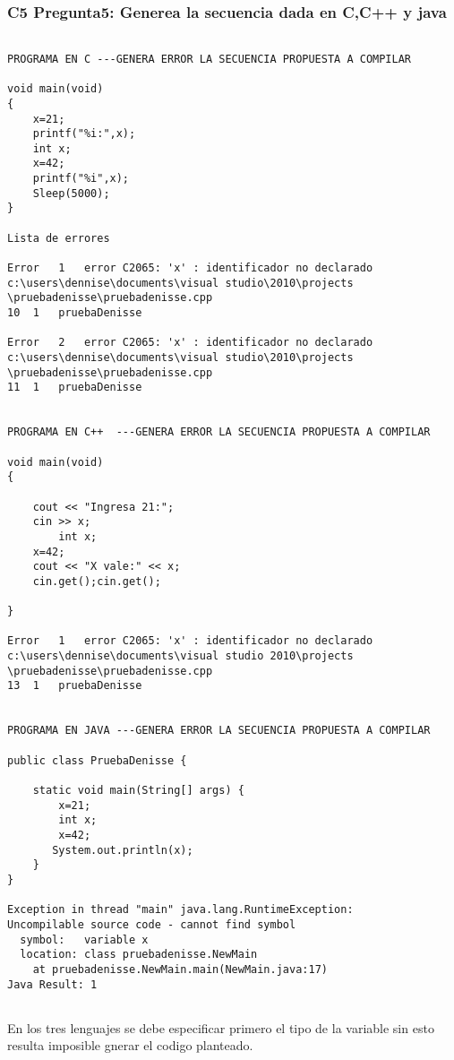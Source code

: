 \subsubsection{C5 Pregunta5: Generea la secuencia dada en C,C++ y java}

\begin{verbatim}

PROGRAMA EN C ---GENERA ERROR LA SECUENCIA PROPUESTA A COMPILAR

void main(void)
{
	x=21;
	printf("%i:",x);
	int x;
	x=42;
	printf("%i",x);
	Sleep(5000);
}

Lista de errores

Error	1	error C2065: 'x' : identificador no declarado
c:\users\dennise\documents\visual studio\2010\projects
\pruebadenisse\pruebadenisse.cpp	
10	1	pruebaDenisse

Error	2	error C2065: 'x' : identificador no declarado	
c:\users\dennise\documents\visual studio\2010\projects
\pruebadenisse\pruebadenisse.cpp
11	1	pruebaDenisse


PROGRAMA EN C++  ---GENERA ERROR LA SECUENCIA PROPUESTA A COMPILAR

void main(void)
{
	
	cout << "Ingresa 21:";
	cin >> x;
        int x;
	x=42;
	cout << "X vale:" << x;
	cin.get();cin.get();
	
}

Error	1	error C2065: 'x' : identificador no declarado 
c:\users\dennise\documents\visual studio 2010\projects
\pruebadenisse\pruebadenisse.cpp
13	1	pruebaDenisse


PROGRAMA EN JAVA ---GENERA ERROR LA SECUENCIA PROPUESTA A COMPILAR

public class PruebaDenisse {

    static void main(String[] args) {
        x=21;
        int x;
        x=42;
       System.out.println(x);
    }
}

Exception in thread "main" java.lang.RuntimeException: 
Uncompilable source code - cannot find symbol
  symbol:   variable x
  location: class pruebadenisse.NewMain 
	at pruebadenisse.NewMain.main(NewMain.java:17)
Java Result: 1


\end{verbatim}
En los tres lenguajes se debe especificar primero el tipo de la variable sin esto \\
resulta imposible gnerar el codigo planteado.